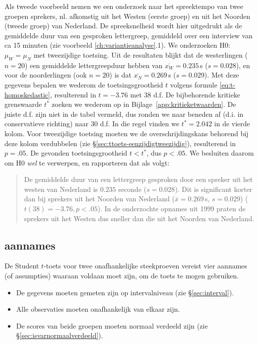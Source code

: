 \documentclass[
]{book}
\begin{document}
Als tweede voorbeeld nemen we een onderzoek naar het spreektempo van
twee groepen sprekers, nl. afkomstig uit het Westen (eerste groep) en
uit het Noorden (tweede groep) van Nederland. De spreeksnelheid wordt
hier uitgedrukt als de gemiddelde duur van een gesproken lettergreep,
gemiddeld over een interview van ca 15 minuten (zie voorbeeld \ref{ch:variantieanalyse}.1).
We onderzoeken H0: \(\mu_W = \mu_N\) met
tweezijdige toetsing. Uit de resultaten blijkt dat de westerlingen
(\(n=20\)) een gemiddelde lettergreepduur hebben van
\(\overline{x_W}=0.235\) s (\(s=0.028\)), en voor de noorderlingen (ook
\(n=20\)) is dat \(\overline{x_N}=0.269\) s (\(s=0.029\)). Met deze gegevens
bepalen we wederom de toetsingsgrootheid \(t\) volgens formule
\eqref{eq:t-homoskedastic}, resulterend in \(t=-3.76\) met 38 d.f. De
bijbehorende kritieke grenswaarde \(t^*\) zoeken we wederom op in
Bijlage~\ref{app:kritieketwaarden}. De juiste d.f. zijn niet in de tabel
vermeld, dus ronden we naar beneden af (d.i. in conservatieve richting)
naar 30 d.f. In die regel vinden we \(t^*=2.042\) in de vierde kolom. Voor
tweezijdige toetsing moeten we de overschrijdingskans behorend bij deze
kolom verdubbelen (zie
§\ref{sec:ttoets-eenzijdigtweezijdig}), resulterend in \(p=.05\). De
gevonden toetsingsgrootheid \(t < t^*\), dus \(p<.05\). We besluiten daarom
om H0 \emph{wel} te verwerpen, en rapporteren dat als volgt:

\begin{quote}
De gemiddelde duur van een lettergreep gesproken door een spreker uit
het westen van Nederland is \(0.235\) seconde (\(s=0.028\)). Dit is
significant korter dan bij sprekers uit het Noorden van Nederland
(\(\overline{x}=0.269\) s, \(s=0.029\)) (\(t(38)=-3.76, p<.05\)). In de
onderzochte opnames uit 1999 praten de sprekers uit het Westen dus
sneller dan die uit het Noorden van Nederland.
\end{quote}

\hypertarget{aannames}{%
\subsection{aannames}\label{aannames}}

De Student \(t\)-toets voor twee onafhankelijke steekproeven vereist vier aannames
(of assumpties) waaraan voldaan moet zijn, om de toets te mogen
gebruiken.

\begin{itemize}
\item
  De gegevens moeten gemeten zijn op intervalniveau (zie
  §\ref{sec:interval}).
\item
  Alle observaties moeten onafhankelijk van elkaar zijn.
\item
  De scores van beide groepen moeten normaal verdeeld zijn (zie
  §\ref{sec:isvarnormaalverdeeld}).
\end{itemize}
\end{document}
